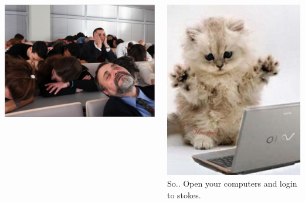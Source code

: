 \documentclass[10pt,compress]{beamer}
\begin{document}
\begin{frame}{}
 
 \begin{columns}[c]
        \begin{center}
            \includegraphics[width=\textwidth]{images/sleepy-lecture.png} 
        \end{center}
        \pause
        \begin{center}
             \includegraphics[width=\textwidth]{images/cat-on-computer.jpg}\\
             So.. Open your computers and login to stokes.
        \end{center}
\end{columns}

\end{frame}
\end{document}
